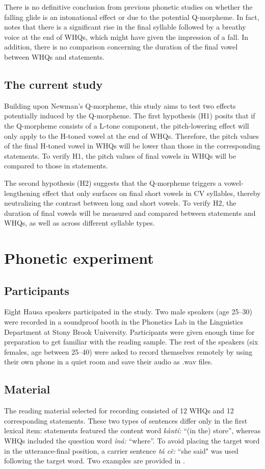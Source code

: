 \documentclass[output=paper,colorlinks,citecolor=brown
]{langscibook}
\begin{document}
There is no definitive conclusion from previous phonetic studies on whether the falling glide is an intonational effect or due to the potential Q-morpheme. In fact, \citet{dresel1977} notes that there is a significant rise in the final syllable followed by a breathy voice at the end of WHQs, which might have given the impression of a fall. In addition, there is no comparison concerning the duration of the final vowel between WHQs and statements.

\subsection{The current study}
Building upon Newman's Q-morpheme, this study aims to test two effects potentially induced by the Q-morpheme. The first hypothesis (H1) posits that if the Q-morpheme consists of a L-tone component, the pitch-lowering effect will only apply to the H-toned vowel at the end of WHQs. Therefore, the pitch values of the final H-toned vowel in WHQs will be lower than those in the corresponding statements. To verify H1, the pitch values of final vowels in WHQs will be compared to those in statements.

The second hypothesis (H2) suggests that the Q-morpheme triggers a vowel-lengthening effect that only surfaces on final short vowels in CV syllables, thereby neutralizing the contrast between long and short vowels. To verify H2, the duration of final vowels will be measured and compared between statements and WHQs, as well as across different syllable types.

\section{Phonetic experiment}

\subsection{Participants}
Eight Hausa speakers participated in the study. Two male speakers (age 25--30) were recorded in a soundproof booth in the Phonetics Lab in the Linguistics Department at Stony Brook University. Participants were given enough time for preparation to get familiar with the reading sample. The rest of the speakers (six females, age between 25--40) were asked to record themselves remotely by using their own phone in a quiet room and save their audio as .wav files.

\subsection{Material}
The reading material selected for recording consisted of 12 WHQs and 12 corresponding statements. These two types of sentences differ only in the first lexical item: statements featured the content word \textit{kàntí:} “(in the) store”, whereas WHQs included the question word \textit{ìná:} “where”. To avoid placing the target word in the utterance-final position, a carrier sentence \textit{tá cê:} ``she said" was used following the target word. Two examples are provided in .
\end{document}
